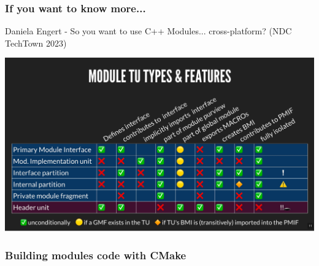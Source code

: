 \documentclass[aspectratio=169]{beamer}
\begin{document}
\begin{frame}
  \frametitle{If you want to know more...}
  \small{Daniela Engert - So you want to use C++ Modules... cross-platform? (NDC TechTown 2023)}
  \begin{center}
    \includegraphics[height=.8\textheight]{modulesgfx/engert_table_new.jpg}
  \end{center}

\end{frame}

\begin{frame}
  \frametitle{Building modules code with CMake}
\end{frame}
\end{document}
